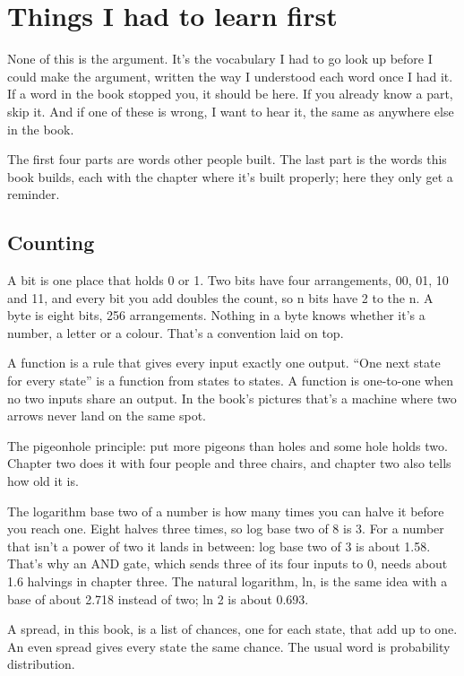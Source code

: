 \documentclass[11pt,twoside]{article}
\theoremstyle{thielethm}
\theoremstyle{thieledef}
\theoremstyle{thieledef}
\theoremstyle{thieledef}
\theoremstyle{thielethm}
\theoremstyle{thieleobs}
\theoremstyle{thielethm}
\begin{document}
\section{Things I had to learn first}
\label{sec:vocab}

None of this is the argument. It's the vocabulary I had to go look up before I could make the argument, written the way I understood each word once I had it. If a word in the book stopped you, it should be here. If you already know a part, skip it. And if one of these is wrong, I want to hear it, the same as anywhere else in the book.

The first four parts are words other people built. The last part is the words this book builds, each with the chapter where it's built properly; here they only get a reminder.

\subsection{Counting}

A bit is one place that holds 0 or 1. Two bits have four arrangements, 00, 01, 10 and 11, and every bit you add doubles the count, so n bits have 2 to the n. A byte is eight bits, 256 arrangements. Nothing in a byte knows whether it's a number, a letter or a colour. That's a convention laid on top.

A function is a rule that gives every input exactly one output. ``One next state for every state'' is a function from states to states. A function is one-to-one when no two inputs share an output. In the book's pictures that's a machine where two arrows never land on the same spot.

The pigeonhole principle: put more pigeons than holes and some hole holds two. Chapter two does it with four people and three chairs, and chapter two also tells how old it is.

The logarithm base two of a number is how many times you can halve it before you reach one. Eight halves three times, so log base two of 8 is 3. For a number that isn't a power of two it lands in between: log base two of 3 is about 1.58. That's why an AND gate, which sends three of its four inputs to 0, needs about 1.6 halvings in chapter three. The natural logarithm, ln, is the same idea with a base of about 2.718 instead of two; ln 2 is about 0.693.

A spread, in this book, is a list of chances, one for each state, that add up to one. An even spread gives every state the same chance. The usual word is probability distribution.
\end{document}
